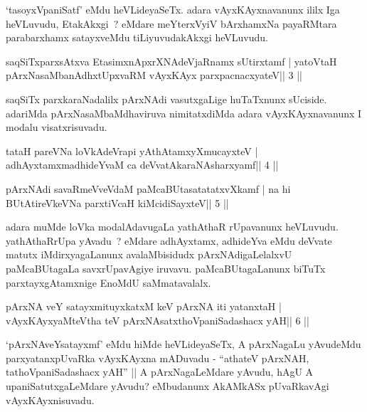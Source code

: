 \begin{artha}
`tasoyxVpaniSatf' eMdu heVLideyaSeTx. adara vAyxKAyxnavanunx ililx Iga   heVLuvudu, EtakAkxgi~? eMdare meYterxVyiV bArxhamxNa payaRMtara   parabarxhamx satayxveMdu tiLiyuvudakAkxgi heVLuvudu.
\end{artha}




\begin{shl}
saqSiTxparxsAtxva EtasimxnApxrXNAdeVjaRnamx sUtirxtamf |
yatoV\s taH pArxNasaMbanAdhxtUpxvaRM vAyxKAyx parxpacnacxyateV\hfill || 3 ||
\end{shl}

\begin{artha}
saqSiTx parxkaraNadalilx pArxNAdi vasutxgaLige huTaTxnunx sUciside. adariMda pArxNasaMbaMdhaviruva nimitatxdiMda adara vAyxKAyxnavanunx I modalu visatxrisuvadu.
\end{artha}

\begin{shl}
tataH pareVNa loVkAdeVrapi yAthAtamxyXmucayxteV |
adhAyxtamxmadhideYvaM ca deVvatAkaraNAsharxyamf\hfill || 4 ||
\end{shl}

\begin{shl}
pArxNAdi savaRmeVveVdaM paMcaBUtasatatatxvXkamf |
na hi BUtAtireVkeVNa parxtiVcaH kiMcidiSayxteV\hfill || 5 ||
\end{shl}

\begin{artha}
adara muMde loVka modalAdavugaLa yathAthaR rUpavanunx heVLuvudu. yathAthaRrUpa yAvadu~? eMdare adhAyxtamx, adhideYva eMdu deVvate matutx iMdirxyagaLanunx avalaMbisidudx pArxNAdigaLelalxvU paMcaBUtagaLa savxrUpavAgiye iruvavu. paMcaBUtagaLanunx biTuTx parxtayxgAtamxnige EnoMdU saMmatavalalx.
\end{artha}

\begin{shl}
pArxNA veY satayxmituyxkatxM keV pArxNA iti yatanxtaH |
vAyxKAyxyaMteV\s tha teV pArxNAsatxthoVpaniSadashacx yAH\hfill || 6 ||
\end{shl}

\begin{artha}
`pArxNAveYsatayxmf' eMdu hiMde heVLideyaSeTx, A pArxNagaLu yAvudeMdu   parxyatanxpUvaRka vAyxKAyxna mADuvadu - ``athateV pArxNAH,   tathoVpaniSadashacx yAH'' || A pArxNagaLeMdare yAvudu, hAgU A   upaniSatutxgaLeMdare yAvudu? eMbudanunx AkAMkASx pUvaRkavAgi   vAyxKAyxnisuvadu.
\end{artha}


